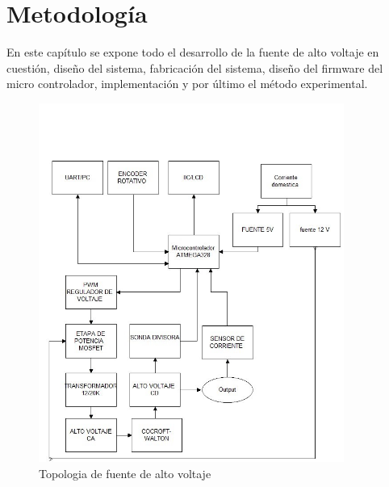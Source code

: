 

\chapter{Metodología}
En este capítulo se expone todo el desarrollo de la fuente de alto voltaje en cuestión, diseño del sistema, fabricación del sistema, diseño del firmware del micro controlador, implementación y por último el método experimental. 

\begin{figure}[H]
\centering
\includegraphics[width=10cm]{Capitulo3/figs/figura1.jpg}
\caption{Topologia de fuente de alto voltaje}
\end{figure}







